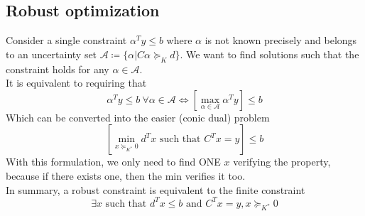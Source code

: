 \documentclass[12pt, openany]{report}
\theoremstyle{definition}
\begin{document}
\subsection{Robust optimization}
Consider a single constraint $\alpha^Ty\le b$ where $\alpha$ is not known precisely and belongs to an uncertainty set $\mathcal{A} \coloneqq \{\alpha | C\alpha \succeq_K d\}$. We want to find solutions such that the constraint holds for any $\alpha\in \mathcal{A}$. \\
It is equivalent to requiring that 
\begin{equation}
    \alpha^Ty\le b\:\forall \alpha\in \mathcal{A}\Longleftrightarrow \left[\max_{\alpha\in \mathcal{A}} \alpha^Ty \right] \le b
\end{equation}
Which can be converted into the easier (conic dual) problem 
\begin{equation}
    \left[\min_{x\succeq_{K^*}0}d^Tx \text{ such that }C^Tx = y\right] \le b
\end{equation}
With this formulation, we only need to find ONE $x$ verifying the property, because if there exists one, then the min verifies it too. \\
In summary, a robust constraint is equivalent to the finite constraint 
\begin{equation}
    \exists x\text{ such that }d^Tx \le b\text{ and }C^Tx = y,x\succeq_{K^*}0
\end{equation}
\end{document}
